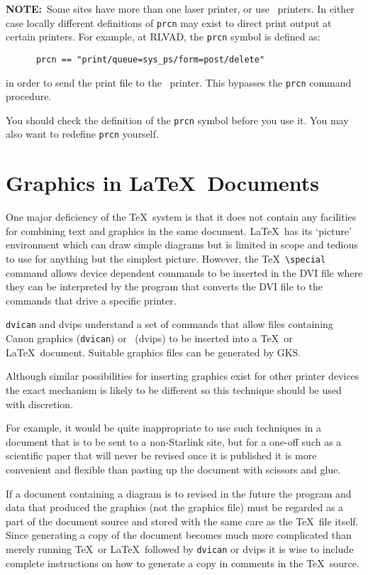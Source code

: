 {\bf NOTE:}~Some sites have more than one laser printer, or use \PS\
printers. In either case locally different definitions of \mbox{\tt prcn} may
exist to direct print output at certain printers. For example, at RLVAD, the 
\mbox{\tt prcn} symbol is defined as:
\begin{verbatim}
      prcn == "print/queue=sys_ps/form=post/delete"
\end{verbatim}
in order to send the print file to the \PS\ printer. This bypasses the
\mbox{\tt prcn} command procedure.

You should check the definition of the \mbox{\tt prcn} symbol  before you use 
it. You may also want to redefine \mbox{\tt prcn} yourself.

\section{Graphics in \LaTeX\ Documents}
\label{se:graphics}

One major deficiency of the \TeX\ system is that it does not contain any
facilities for combining text and graphics in the same document. \LaTeX\ has
its `picture' environment which can draw simple diagrams but is limited
in scope and tedious to use for anything but the simplest picture. However,
the \TeX\ {\tt\verb+\special+} command allows device dependent commands
to be inserted in the DVI file where they can be interpreted by the program
that converts the DVI file to the commands that drive a specific printer.

\verb+dvican+ and dvips understand a set of commands that allow files
containing Canon graphics (\verb+dvican+) or \PS\ (dvips) to be inserted 
into a \TeX\ or \LaTeX\
document. Suitable graphics files can be generated by GKS.

Although similar possibilities for inserting graphics exist for other printer 
devices the exact mechanism is likely to be different so this technique should 
be used with discretion.  

For example, it would be quite inappropriate to use such techniques in a 
document that is to be sent to a non-Starlink site, but for a one-off such as 
a scientific paper that will never be revised once it is published it is more 
convenient and flexible than pasting up the document with scissors and glue. 

If a document containing a diagram is to revised in the future the program and 
data that produced the graphics (not the graphics file) must be regarded as a 
part of the document source and stored with the same care as the \TeX\ file 
itself. Since generating a copy of the document becomes much more complicated 
than merely running \TeX\ or \LaTeX\ followed by \verb+dvican+ or dvips it is wise to 
include complete instructions on how to generate a copy in comments in the 
\TeX\ source.

